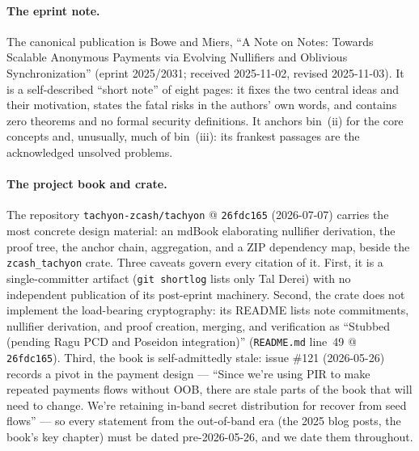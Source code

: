 \documentclass[11pt,a4paper]{article}
\theoremstyle{definition}
\begin{document}
\paragraph{The eprint note.} The canonical publication is Bowe and Miers, ``A
Note on Notes: Towards Scalable Anonymous Payments via Evolving Nullifiers and
Oblivious Synchronization'' (eprint 2025/2031; received 2025-11-02, revised
2025-11-03). It is a self-described ``short note'' of eight pages: it fixes
the two central ideas and their motivation, states the fatal risks in the
authors' own words, and contains zero theorems and no formal security
definitions. It anchors bin~(ii) for the core concepts and, unusually, much of
bin~(iii): its frankest passages are the acknowledged unsolved problems.

\paragraph{The project book and crate.} The repository
\texttt{tachyon-zcash/tachyon} @ \texttt{26fdc165} (2026-07-07) carries the
most concrete design material: an mdBook elaborating nullifier derivation, the
proof tree, the anchor chain, aggregation, and a ZIP dependency map, beside
the \texttt{zcash\_tachyon} crate. Three caveats govern every citation of it.
First, it is a single-committer artifact (\texttt{git shortlog} lists only Tal
Derei) with no independent publication of its post-eprint machinery. Second,
the crate does not implement the load-bearing cryptography: its README lists
note commitments, nullifier derivation, and proof creation, merging, and
verification as ``Stubbed (pending Ragu PCD and Poseidon integration)''
(\texttt{README.md} line~49 @ \texttt{26fdc165}). Third, the book is
self-admittedly stale: issue \#121 (2026-05-26) records a pivot in the payment
design --- ``Since we're using PIR to make repeated payments flows without
OOB, there are stale parts of the book that will need to change. We're
retaining in-band secret distribution for recover from seed flows'' --- so
every statement from the out-of-band era (the 2025 blog posts, the book's key
chapter) must be dated pre-2026-05-26, and we date them throughout.
\end{document}
